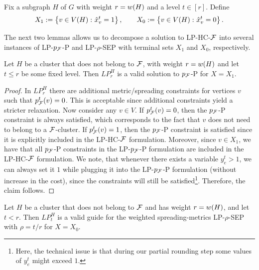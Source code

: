     Fix a subgraph $H$ of $G$ with weight $r=w\mathopen{}\left( H \right)$ and a level $t\in [r]$. Define
    \[
        X_1:=\mathopen{}\left\{ v\in V\mathopen{}\left( H \right)\colon \hat{x}_v^t=1 \right\}, \qquad X_0:=\mathopen{}\left\{ v\in V\mathopen{}\left( H \right)\colon \hat{x}_v^t=0 \right\}.
    \]

    The next two lemmas allows us to decompose a solution to \textsc{LP-HC-$\mathcal{F}$} into several instances of \textsc{LP-$p_{\mathcal{F}}$-P} and \textsc{LP-$\rho$-SEP} with terminal sets $X_1$ and $X_0$, respectively.
    \begin{lemma}\label{lem:lp-fes}
        Let $H$ be a cluster that does not belong to $\mathcal{F}$, with weight $r=w\mathopen{}\left( H \right)$ and let $t\leq r$ be some fixed level. Then $LP_r^H$ is a valid solution to \textsc{$p_{\mathcal{F}}$-P} for $X=X_1$.
    \end{lemma}
    \begin{proof}
        In $LP_r^H$ there are additional metric/spreading constraints for vertices $v$ such that $p_{\mathcal{F}}^t(v)=0$. This is acceptable since additional constraints yield a stricter relaxation. Now consider any $v\in V$. If $p_{\mathcal{F}}^t(v)=0$, then the $p_{\mathcal{F}}$-P constraint is always satisfied, which corresponds to the fact that $v$ does not need to belong to a $\mathcal{F}$-cluster. If $p_{\mathcal{F}}^t(v)=1$, then the $p_{\mathcal{F}}$-P constraint is satisfied since it is explicitly included in the \textsc{LP-HC-$\mathcal{F}$} formulation. Moreover, since $v\in X_1$, we have that all $p_{\mathcal{F}}$-P constraints in the \textsc{LP-$p_{\mathcal{F}}$-P} formulation are included in the \textsc{LP-HC-$\mathcal{F}$} formulation. 
        We note, that whenever there exists a variable $y_e^t>1$, we can always set it $1$ while plugging it into the \textsc{LP-$p_{\mathcal{F}}$-P} formulation (without increase in the cost), since the constraints will still be satisfied\footnote{Here, the technical issue is that during our partial rounding step some values of $y_e^t$ might exceed $1$.}.
        Therefore, the claim follows.
    \end{proof}
    \begin{lemma}\label{lem:lp-ksep}
        Let $H$ be a cluster that does not belong to $\mathcal{F}$ and has weight $r=w\mathopen{}\left( H \right)$, and let $t<r$. Then $LP_t^H$ is a valid guide for the weighted spreading-metrics \textsc{LP-$\rho$-SEP} with $\rho=t/r$ for $X=X_0$.
    \end{lemma}

